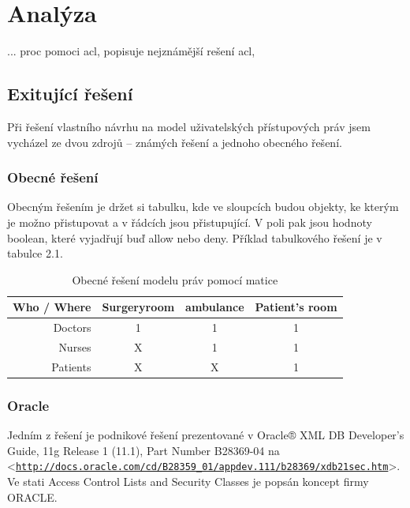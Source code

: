 \documentclass[11pt,twoside,a4paper]{book}
\let\oldUrl\url
\renewcommand\url[1]{<\texttt{\oldUrl{#1}}>}
\begin{document}
\section{Analýza}

... proc pomoci acl, popisuje nejznámější rešení acl, 



\subsection{Exitující řešení}

Při řešení vlastního návrhu na model uživatelských přístupových práv jsem vycházel ze dvou zdrojů – známých řešení a jednoho obecného řešení.

\subsubsection{Obecné řešení}
Obecným řešením je držet si tabulku, kde ve sloupcích budou objekty, ke kterým je možno přistupovat a v řádcích jsou přistupující. V poli pak jsou hodnoty boolean, které vyjadřují buď allow nebo deny. Příklad tabulkového řešení je v tabulce 2.1.

\begin{table}%
\centering
\begin{tabular}{|r||c|c|c|}
\hline
Who / Where & Surgeryroom & ambulance & Patient's room\\
\hline\hline
Doctors & 1 & 1 & 1\\
\hline
Nurses & X & 1 & 1\\
\hline
Patients & X & X & 1\\
\hline
\end{tabular}
\caption{Obecné řešení modelu práv pomocí matice}
\end{table}


\subsubsection{Oracle}
Jedním z řešení je podnikové řešení prezentované v Oracle® XML DB Developer's Guide, 11g Release 1 (11.1), Part Number B28369-04 na \url{http://docs.oracle.com/cd/B28359_01/appdev.111/b28369/xdb21sec.htm}. Ve stati Access Control Lists and Security Classes je popsán koncept firmy ORACLE.
 
\end{document}
